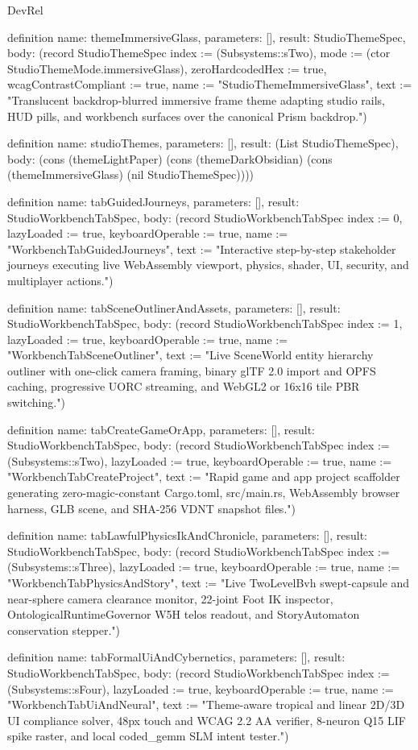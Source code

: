 \begin{lexlean}{DevRel}
\begin{semanticmodule}
definition{
  name: themeImmersiveGlass,
  parameters: [],
  result: StudioThemeSpec,
  body: (record StudioThemeSpec {index := (Subsystems::sTwo), mode := (ctor StudioThemeMode.immersiveGlass), zeroHardcodedHex := true, wcagContrastCompliant := true, name := "StudioThemeImmersiveGlass", text := "Translucent backdrop-blurred immersive frame theme adapting studio rails, HUD pills, and workbench surfaces over the canonical Prism backdrop."})
}

definition{
  name: studioThemes,
  parameters: [],
  result: (List StudioThemeSpec),
  body: (cons (themeLightPaper) (cons (themeDarkObsidian) (cons (themeImmersiveGlass) (nil StudioThemeSpec))))
}

definition{
  name: tabGuidedJourneys,
  parameters: [],
  result: StudioWorkbenchTabSpec,
  body: (record StudioWorkbenchTabSpec {index := 0, lazyLoaded := true, keyboardOperable := true, name := "WorkbenchTabGuidedJourneys", text := "Interactive step-by-step stakeholder journeys executing live WebAssembly viewport, physics, shader, UI, security, and multiplayer actions."})
}

definition{
  name: tabSceneOutlinerAndAssets,
  parameters: [],
  result: StudioWorkbenchTabSpec,
  body: (record StudioWorkbenchTabSpec {index := 1, lazyLoaded := true, keyboardOperable := true, name := "WorkbenchTabSceneOutliner", text := "Live SceneWorld entity hierarchy outliner with one-click camera framing, binary glTF 2.0 import and OPFS caching, progressive UORC streaming, and WebGL2 or 16x16 tile PBR switching."})
}

definition{
  name: tabCreateGameOrApp,
  parameters: [],
  result: StudioWorkbenchTabSpec,
  body: (record StudioWorkbenchTabSpec {index := (Subsystems::sTwo), lazyLoaded := true, keyboardOperable := true, name := "WorkbenchTabCreateProject", text := "Rapid game and app project scaffolder generating zero-magic-constant Cargo.toml, src/main.rs, WebAssembly browser harness, GLB scene, and SHA-256 VDNT snapshot files."})
}

definition{
  name: tabLawfulPhysicsIkAndChronicle,
  parameters: [],
  result: StudioWorkbenchTabSpec,
  body: (record StudioWorkbenchTabSpec {index := (Subsystems::sThree), lazyLoaded := true, keyboardOperable := true, name := "WorkbenchTabPhysicsAndStory", text := "Live TwoLevelBvh swept-capsule and near-sphere camera clearance monitor, 22-joint Foot IK inspector, OntologicalRuntimeGovernor W5H telos readout, and StoryAutomaton conservation stepper."})
}

definition{
  name: tabFormalUiAndCybernetics,
  parameters: [],
  result: StudioWorkbenchTabSpec,
  body: (record StudioWorkbenchTabSpec {index := (Subsystems::sFour), lazyLoaded := true, keyboardOperable := true, name := "WorkbenchTabUiAndNeural", text := "Theme-aware tropical and linear 2D/3D UI compliance solver, 48px touch and WCAG 2.2 AA verifier, 8-neuron Q15 LIF spike raster, and local coded_gemm SLM intent tester."})
}


\end{semanticmodule}
\end{lexlean}

